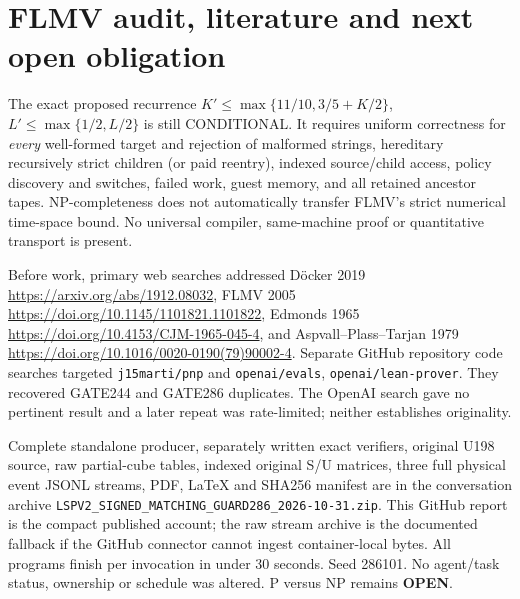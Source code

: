\documentclass[10pt]{article}
\begin{document}
\section*{FLMV audit, literature and next open obligation}
The exact proposed recurrence
$K'\le\max\{11/10,3/5+K/2\}$,
$L'\le\max\{1/2,L/2\}$ is still CONDITIONAL.
It requires uniform correctness for \emph{every} well-formed target
and rejection of malformed strings, hereditary recursively strict
children (or paid reentry), indexed source/child access, policy
discovery and switches, failed work, guest memory, and all retained
ancestor tapes. NP-completeness does not automatically transfer
FLMV's strict numerical time-space bound. No universal compiler,
same-machine proof or quantitative transport is present.

Before work, primary web searches addressed D\"ocker 2019
\url{https://arxiv.org/abs/1912.08032}, FLMV 2005
\url{https://doi.org/10.1145/1101821.1101822}, Edmonds 1965
\url{https://doi.org/10.4153/CJM-1965-045-4},
and Aspvall--Plass--Tarjan 1979
\url{https://doi.org/10.1016/0020-0190(79)90002-4}.
Separate GitHub repository code searches targeted \texttt{j15marti/pnp}
and \texttt{openai/evals}, \texttt{openai/lean-prover}.
They recovered GATE244 and GATE286 duplicates. The OpenAI search
gave no pertinent result and a later repeat was rate-limited;
neither establishes originality.

Complete standalone producer, separately written exact verifiers,
original U198 source, raw partial-cube tables, indexed original
S/U matrices, three full physical event JSONL streams, PDF,
LaTeX and SHA256 manifest are in the conversation archive
\texttt{LSPV2\_SIGNED\_MATCHING\_GUARD286\_2026-10-31.zip}.
This GitHub report is the compact published account; the raw
stream archive is the documented fallback if the GitHub connector
cannot ingest container-local bytes. All programs finish per
invocation in under 30 seconds. Seed 286101. No agent/task status,
ownership or schedule was altered. P versus NP remains \textbf{OPEN}.
\end{document}
